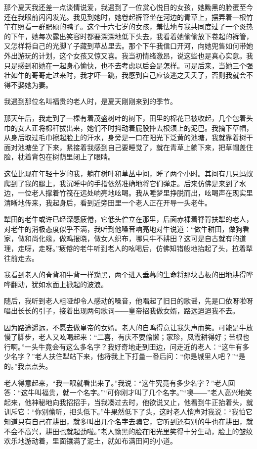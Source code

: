 \documentclass[12pt,UTF8]{ctexbook}
\begin{document}
那个夏天我还差一点谈情说爱，我遇到了一位赏心悦目的女孩，她黝黑的脸蛋至今还在我眼前闪闪发光。我见到她时，她卷起裤管坐在河边的青草上，摆弄着一根竹竿在照看一群肥硕的鸭子。这个十六七岁的女孩，羞怯地与我共同度过了一个炎热的下午，她每次露出笑容时都要深深地低下头去，我看着她偷偷放下卷起的裤管，又怎样将自己的光脚丫子藏到草丛里去。那个下午我信口开河，向她兜售如何带她外出游玩的计划，这个女孩又惊又喜。我当初情绪激昂，说这些也是真心实意。我只是感到和她在一起身心愉快，也不去考虑以后会是怎样。可是后来，当她三个强壮如牛的哥哥走过来时，我才吓一跳，我感到自己应该逃之夭夭了，否则我就会不得不娶她为妻。

我遇到那位名叫福贵的老人时，是夏天刚刚来到的季节。

那天午后，我走到了一棵有着茂盛树叶的树下，田里的棉花已被收起，几个包着头巾的女人正将棉秆拔出来，她们不时抖动着屁股摔去根须上的泥巴。我摘下草帽，从身后取过毛巾擦起脸上的汗水，身旁是一口在阳光下泛黄的池塘，我就靠着树干面对池塘坐了下来，紧接着我感到自己要睡觉了，就在青草上躺下来，把草帽盖住脸，枕着背包在树荫里闭上了眼睛。

这位比现在年轻十岁的我，躺在树叶和草丛中间，睡了两个小时。其间有几只蚂蚁爬到了我的腿上，我沉睡中的手指依然准确地将它们弹走。后来仿佛是来到了水边，一位老人撑着竹筏在远处响亮地吆喝。我从睡梦里挣脱而出，吆喝声在现实里清晰地传来，我起身后，看到近旁田里一个老人正在开导一头老牛。

犁田的老牛或许已经深感疲倦，它低头伫立在那里，后面赤裸着脊背扶犁的老人，对老牛的消极态度似乎不满，我听到他嗓音响亮地对牛说道：“做牛耕田，做狗看家，做和尚化缘，做鸡报晓，做女人织布，哪只牛不耕田？这可是自古就有的道理，走呀，走呀。”疲倦的老牛听到老人的吆喝后，仿佛知错般地抬起了头，拉着犁往前走去。

我看到老人的脊背和牛背一样黝黑，两个进入垂暮的生命将那块古板的田地耕得哗哗翻动，犹如水面上掀起的波浪。

随后，我听到老人粗哑却令人感动的嗓音，他唱起了旧日的歌谣，先是口依呀啦呀唱出长长的引子，接着出现两句歌词――皇帝招我做女婿，路远迢迢我不去。

因为路途遥远，不愿去做皇帝的女婿。老人的自鸣得意让我失声而笑。可能是牛放慢了脚步，老人又吆喝起来：“二喜，有庆不要偷懒；家珍，凤霞耕得好；苦根也行啊。”一头牛竟会有这么多名字？我好奇地走到田边，问走近的老人：“这牛有多少名字？”老人扶住犁站下来，他将我上下打量一番后问：“你是城里人吧？”“是的。”我点点头。

老人得意起来，“我一眼就看出来了。”我说：“这牛究竟有多少名字？”老人回答：“这牛叫福贵，就一个名字。”“可你刚才叫了几个名字。”“噢――”老人高兴地笑起来，他神秘地向我招招手，当我凑过去时，他欲说又止，他看到牛正抬着头，就训斥它：“你别偷听，把头低下。”牛果然低下了头，这时老人悄声对我说：“我怕它知道只有自己在耕田，就多叫出几个名字去骗它，它听到还有别的牛也在耕田，就不会不高兴，耕田也就起劲啦。”老人黝黑的脸在阳光里笑得十分生动，脸上的皱纹欢乐地游动着，里面镶满了泥土，就如布满田间的小道。
\end{document}
